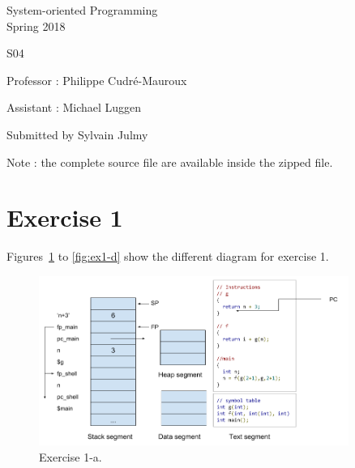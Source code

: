 \documentclass[a4paper,11pt]{report}
\author{Sylvain Julmy}
\date{\today}
\begin{document}
\begin{center}
  \Large{
    System-oriented Programming\\
    Spring 2018
  }
  
  \noindent\makebox[\linewidth]{\rule{\linewidth}{0.4pt}}
  S04
  \noindent\makebox[\linewidth]{\rule{\linewidth}{0.4pt}}

  \begin{flushleft}
    Professor : Philippe Cudré-Mauroux

    Assistant : Michael Luggen
  \end{flushleft}
  
  \noindent\makebox[\linewidth]{\rule{\linewidth}{0.4pt}}

  Submitted by Sylvain Julmy
  
  \noindent\makebox[\linewidth]{\rule{\textwidth}{1pt}}
\end{center}

Note : the complete source file are available inside the zipped file.

\section*{Exercise 1}

Figures~\ref{fig:ex1-a} to \ref{fig:ex1-d} show the different diagram for
exercise 1.

\begin{figure}[ht]
  \centering
  \includegraphics[width=0.9\textwidth]{figures/SOP_s05_ex1_a}
  \caption{\label{fig:ex1-a} Exercise 1-a.}
\end{figure}
\end{document}
